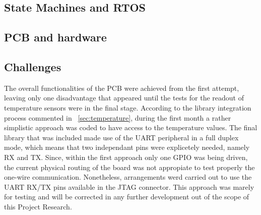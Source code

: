 \subsection{State Machines and RTOS}
\subsection{PCB and hardware}
\subsection{Challenges}
The overall functionalities of the PCB were achieved from the first attempt, leaving only one disadvantage that appeared until the tests for the readout of temperature sensors were in the final stage. According to the library integration process commented in ~\ref{sec:temperature}, during the first month a rather simplistic approach was coded to have access to the temperature values. The final library that was included made use of the UART peripheral in a full duplex mode, which means that two independant pins were explicetely needed, namely RX and TX. Since, within the first approach only one GPIO was being driven, the current physical routing of the board was not appropiate to test properly the one-wire communication. Nonetheless, arrangements werd carried out to use the UART RX/TX pins available in the JTAG connector. This approach was marely for testing and will be corrected in any further development out of the scope of this Project Research.

